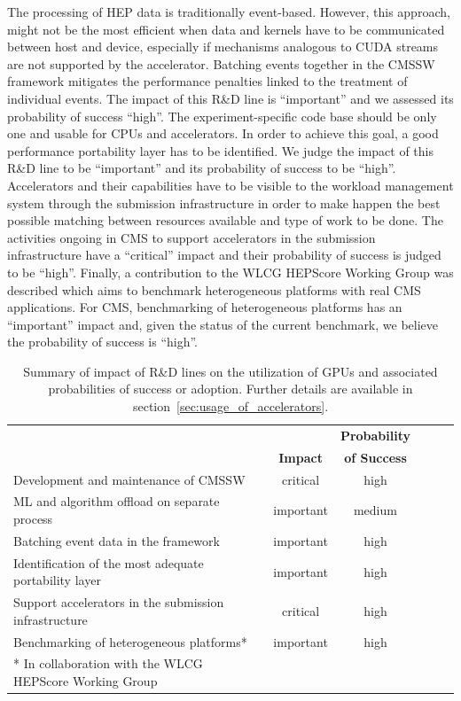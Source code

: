 \documentclass{cmspaper}
\newcommand{\trh}{\cellcolor{tablerowheader}}
\newcommand{\B}[1]{\textbf{#1}}
\begin{document}
The processing of HEP data is traditionally event-based. However, this approach, might not be the most efficient when data and kernels have to be communicated between host and device, especially if mechanisms analogous to CUDA streams are not supported by the accelerator. Batching events together in the CMSSW framework mitigates the performance penalties linked to the treatment of individual events. The impact of this R\&D line is ``important'' and we assessed its probability of success ``high''. The experiment-specific code base should be only one and usable for CPUs and accelerators. In order to achieve this goal, a good performance portability layer has to be identified. We judge the impact of this R\&D line to be ``important'' and its probability of success to be ``high''.
Accelerators and their capabilities have to be visible to the workload management system through the submission infrastructure in order to make happen the best possible matching between resources available and type of work to be done. The activities ongoing in CMS to support accelerators in the submission infrastructure have a ``critical'' impact and their probability of success is judged to be ``high''. Finally, a contribution to the WLCG HEPScore Working Group was described which aims to benchmark heterogeneous platforms with real CMS applications. For CMS, benchmarking of heterogeneous platforms has an ``important'' impact and, given the status of the current benchmark, we believe the probability of success is ``high''.

\begin{table}[ht]
\begin{center}
\caption{Summary of impact of R\&D lines on the utilization of GPUs and associated probabilities of success or adoption. Further details are available in section~\ref{sec:usage_of_accelerators}.}
\label{tab:summary-gpu-fwk}
\begin{tabular}{lccccc} 
\hline 
\rowcolor{tableheader}                                         &                              & \B{Probability}  \\
\rowcolor{tableheader} \multirow{-2}{*}{\B{Short description}} & \multirow{-2}{*}{\B{Impact}} & \B{of Success}   \\
\hline \hline
\trh Development and maintenance of CMSSW                  & critical  & high      \\
\trh ML and algorithm offload on separate process          & important & medium    \\
\trh Batching event data in the framework                  & important & high      \\
\trh Identification of the most adequate portability layer & important & high      \\
\trh Support accelerators in the submission infrastructure & critical  & high      \\
\trh Benchmarking of heterogeneous platforms*              & important & high      \\ \hline
\footnotesize{* In collaboration with the WLCG HEPScore Working Group}
\end{tabular}
\end{center}
\end{table}
\end{document}
